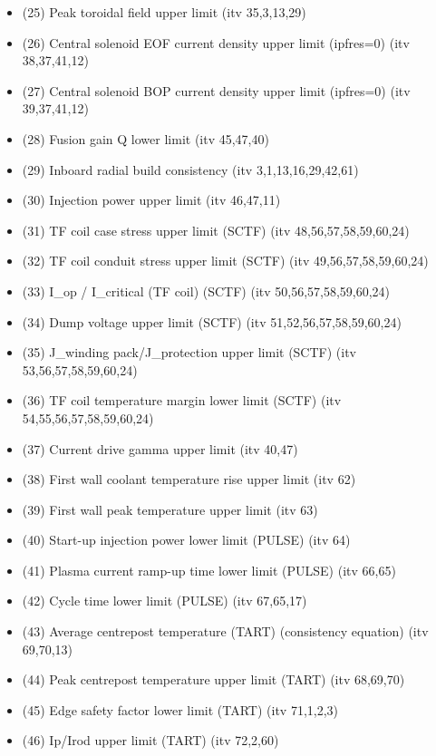 \documentclass[
]{article}
\begin{document}
\begin{itemize}
\begin{itemize}
    (24) Beta upper limit (itv 36,1,2,3,4,6,18)
  \item
    (25) Peak toroidal field upper limit (itv 35,3,13,29)
  \item
    (26) Central solenoid EOF current density upper limit (ipfres=0)
    (itv 38,37,41,12)
  \item
    (27) Central solenoid BOP current density upper limit (ipfres=0)
    (itv 39,37,41,12)
  \item
    (28) Fusion gain Q lower limit (itv 45,47,40)
  \item
    (29) Inboard radial build consistency (itv 3,1,13,16,29,42,61)
  \item
    (30) Injection power upper limit (itv 46,47,11)
  \item
    (31) TF coil case stress upper limit (SCTF) (itv
    48,56,57,58,59,60,24)
  \item
    (32) TF coil conduit stress upper limit (SCTF) (itv
    49,56,57,58,59,60,24)
  \item
    (33) I\_op / I\_critical (TF coil) (SCTF) (itv 50,56,57,58,59,60,24)
  \item
    (34) Dump voltage upper limit (SCTF) (itv 51,52,56,57,58,59,60,24)
  \item
    (35) J\_winding pack/J\_protection upper limit (SCTF) (itv
    53,56,57,58,59,60,24)
  \item
    (36) TF coil temperature margin lower limit (SCTF) (itv
    54,55,56,57,58,59,60,24)
  \item
    (37) Current drive gamma upper limit (itv 40,47)
  \item
    (38) First wall coolant temperature rise upper limit (itv 62)
  \item
    (39) First wall peak temperature upper limit (itv 63)
  \item
    (40) Start-up injection power lower limit (PULSE) (itv 64)
  \item
    (41) Plasma current ramp-up time lower limit (PULSE) (itv 66,65)
  \item
    (42) Cycle time lower limit (PULSE) (itv 67,65,17)
  \item
    (43) Average centrepost temperature (TART) (consistency equation)
    (itv 69,70,13)
  \item
    (44) Peak centrepost temperature upper limit (TART) (itv 68,69,70)
  \item
    (45) Edge safety factor lower limit (TART) (itv 71,1,2,3)
  \item
    (46) Ip/Irod upper limit (TART) (itv 72,2,60)

\end{itemize}
\end{itemize}
\end{document}
